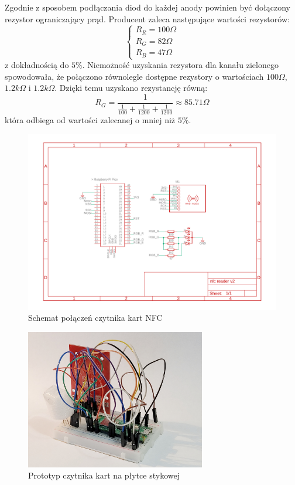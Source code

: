 Zgodnie z sposobem podłączania diod do każdej anody powinien być dołączony rezystor ograniczający prąd. Producent zaleca następujące wartości rezystorów:
\begin{equation}
    \begin{cases}
        R_R=100\Omega \\
        R_G=82\Omega  \\
        R_B=47\Omega
    \end{cases}
\end{equation}
z dokładnością do $5\%$. Niemożność uzyskania rezystora dla kanału zielonego spowodowała, że połączono równolegle dostępne rezystory o wartościach $100\Omega$, $1.2k\Omega$ i $1.2k\Omega$. Dzięki temu uzyskano rezystancję równą:
\begin{equation}
    R_G = \frac{1}{\frac{1}{100}+\frac{1}{1200}+\frac{1}{1200}} \approx 85.71\Omega
\end{equation}
która odbiega od wartości zalecanej o mniej niż $5\%$. \newpage
\begin{figure}[H]
    \centering
    \includegraphics[width=\textwidth]{graf/nfcReader.pdf}
    \caption{Schemat połączeń czytnika kart NFC}
    \label{fig:readerConnection}
\end{figure}
\begin{figure}[H]
    \centering
    \includegraphics[width=0.7\textwidth, frame]{graf/protoCzytnik.jpg}
    \caption{Prototyp czytnika kart na płytce stykowej}
    \label{fig:readerConfig}
\end{figure}